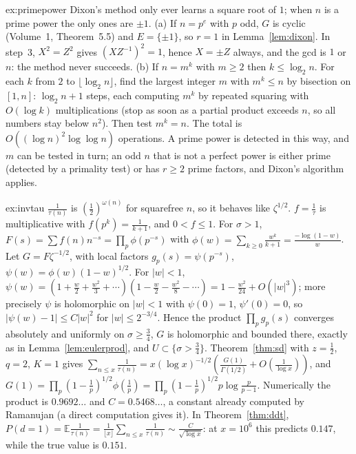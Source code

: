 \begin{solution}{ex:primepower}
\idea Dixon's method only ever learns a square root of $1$; when $n$ is a prime power the only ones are $\pm1$.
\writeup (a) If $n=p^e$ with $p$ odd, $G$ is cyclic (Volume~1, Theorem~5.5) and $E=\{\pm1\}$, so $r=1$ in Lemma~\ref{lem:dixon}. In step~3, $X^2=Z^2$ gives $(XZ^{-1})^2=1$, hence $X=\pm Z$ always, and the gcd is $1$ or $n$: the method never succeeds. (b) If $n=m^k$ with $m\ge2$ then $k\le\log_2n$. For each $k$ from $2$ to $\lfloor\log_2n\rfloor$, find the largest integer $m$ with $m^k\le n$ by bisection on $[1,n]$: $\log_2n+1$ steps, each computing $m^k$ by repeated squaring with $O(\log k)$ multiplications (stop as soon as a partial product exceeds $n$, so all numbers stay below $n^2$). Then test $m^k=n$. The total is $O((\log n)^2\log\log n)$ operations. A prime power is detected in this way, and $m$ can be tested in turn; an odd $n$ that is not a perfect power is either prime (detected by a primality test) or has $r\ge2$ prime factors, and Dixon's algorithm applies.
\end{solution}

\begin{solution}{ex:invtau}
\idea $\frac1{\tau(n)}$ is $(\frac12)^{\omega(n)}$ for squarefree $n$, so it behaves like $\zeta^{1/2}$.
\writeup $f=\frac1\tau$ is multiplicative with $f(p^k)=\frac1{k+1}$, and $0<f\le1$. For $\sigma>1$, $F(s)=\sum f(n)n^{-s}=\prod_p\phi(p^{-s})$ with $\phi(w)=\sum_{k\ge0}\frac{w^k}{k+1}=\frac{-\log(1-w)}w$. Let $G=F\zeta^{-1/2}$, with local factors $g_p(s)=\psi(p^{-s})$, $\psi(w)=\phi(w)(1-w)^{1/2}$. For $|w|<1$, $\psi(w)=(1+\frac w2+\frac{w^2}3+\cdots)(1-\frac w2-\frac{w^2}8-\cdots)=1-\frac{w^2}{24}+O(|w|^3)$; more precisely $\psi$ is holomorphic on $|w|<1$ with $\psi(0)=1$, $\psi'(0)=0$, so $|\psi(w)-1|\le C|w|^2$ for $|w|\le2^{-3/4}$. Hence the product $\prod_pg_p(s)$ converges absolutely and uniformly on $\sigma\ge\frac34$, $G$ is holomorphic and bounded there, exactly as in Lemma~\ref{lem:eulerprod}, and $U\subset\{\sigma>\frac34\}$. Theorem~\ref{thm:sd} with $z=\frac12$, $q=2$, $K=1$ gives $\sum_{n\le x}\frac1{\tau(n)}=x(\log x)^{-1/2}(\frac{G(1)}{\Gamma(1/2)}+O(\frac1{\log x}))$, and $G(1)=\prod_p(1-\frac1p)^{1/2}\phi(\frac1p)=\prod_p(1-\frac1p)^{1/2}p\log\frac p{p-1}$. Numerically the product is $0.9692\ldots$ and $C=0.5468\ldots$, a constant already computed by Ramanujan (a direct computation gives it). In Theorem~\ref{thm:ddt}, $P(d=1)=\mathbb E\frac1{\tau(n)}=\frac1{\lfloor x\rfloor}\sum_{n\le x}\frac1{\tau(n)}\sim\frac C{\sqrt{\log x}}$: at $x=10^6$ this predicts $0.147$, while the true value is $0.151$.
\end{solution}

